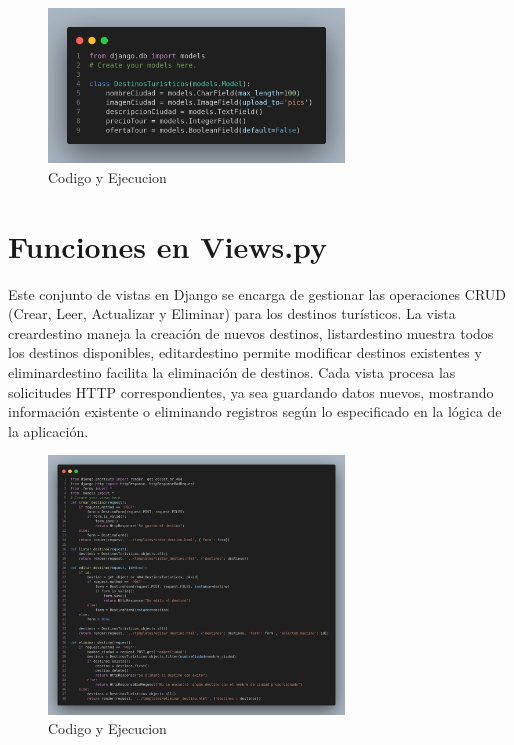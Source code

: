 \documentclass[10pt, a4paper]{article}
\begin{document}
\begin{figure}[H]
  \centering
  \includegraphics[width=0.7\textwidth]{img/models-DestinosTuristicos.png}
  \caption{Codigo y Ejecucion}
\end{figure}

\section{Funciones en Views.py}
Este conjunto de vistas en Django se encarga de gestionar las operaciones CRUD (Crear, Leer, Actualizar y Eliminar) para los destinos turísticos. La vista creardestino maneja la creación de nuevos destinos, listardestino muestra todos los destinos disponibles, editardestino permite modificar destinos existentes y eliminardestino facilita la eliminación de destinos. Cada vista procesa las solicitudes HTTP correspondientes, ya sea guardando datos nuevos, mostrando información existente o eliminando registros según lo especificado en la lógica de la aplicación.

\begin{figure}[H]
  \centering
  \includegraphics[width=0.7\textwidth]{img/views-DestinosTuristicos.png}
  \caption{Codigo y Ejecucion}
\end{figure}
\end{document}
